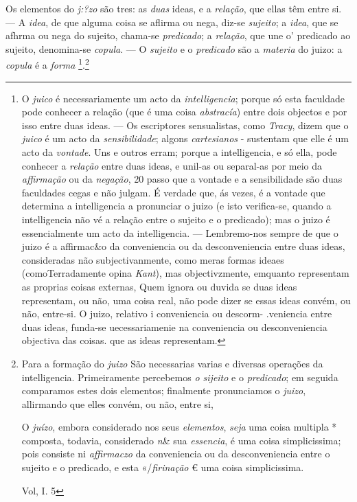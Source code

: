 Os elementos do \emph{j:?zo} são tres: as \emph{duas} ideas, e a \emph{relação}, que ellas têm entre si. --- A \emph{idea}, de que alguma coisa se aflirma ou nega, diz-se \emph{sujeito}; a \emph{idea}, que se afhrma ou nega do sujeito, chama-se \emph{predicado}; a \emph{relação}, que une o' predicado ao sujeito, denomina-se \emph{copula}. --- O \emph{sujeito} e o \emph{predicado} são a \emph{materia} do juizo: a \emph{copula} é a \emph{forma} \footnote{O \emph{juico} é necessariamente um acto da \emph{intelligencia}; porque só esta faculdade pode conhecer a relação (que é uma coisa \emph{abstracía}) entre dois objectos e por isso entre duas ideas. --- Os escriptores sensualistas, como \emph{Tracy}, dizem que o \emph{juico} é um acto da \emph{sensibilidade}; algons \emph{cartesianos} - sustentam que elle é um acto da \emph{vontade}. Uns e outros erram; porque a intelligencia, e só ella, pode conhecer a \emph{relação} entre duas ideas, e unil-as ou separal-as por meio da \emph{affirmação} ou da \emph{negação}, 20 passo que a vontade e a sensibilidade são duas faculdades cegas e não julgam. É verdade que, ás vezes, é a vontade que determina a intelligencia a pronunciar o juizo (e isto verifica-se, quando a intelligencia não vé a relação entre o sujeito e o predicado); mas o juizo é essencialmente um acto da intelligencia. --- Lembremo-nos sempre de que o juizo é a affirmac\&o da conveniencia ou da desconveniencia entre duas ideas, consideradas não subjectivanmente, como meras formas ideaes (comoTerradamente opina \emph{Kant}), mas objectivzmente, emquanto representam as proprias coisas externas, Quem ignora ou duvida se duas ideas representam, ou não, uma coisa real, não pode dizer se essas ideas convém, ou não, entre-si. O juizo, relativo i conveniencia ou descorm- .veniencia entre duas ideas, funda-se uecessariamenie na conveniencia ou desconveniencia objectiva das coisas. que as ideas representam.}.\footnote{Para a formação do \emph{juizo} São necessarias varias e diversas operações da intelligencia. Primeiramente percebemos \emph{o sijeito} e o \emph{predicado}; em seguida comparamos estes dois elementos; finalmente pronunciamos o \emph{juizo}, allirmando que elles convém, ou não, entre si,\par O \emph{juízo}, embora considerado nos seus \emph{elementos}, \emph{seja} uma coisa multipla * composta, todavia, considerado \emph{n}\& sua \emph{essencia}, é uma coisa simplicissima; pois consiste ni \emph{affirmaczo} da conveniencia ou da desconveniencia entre o sujeito e o predicado, e esta «/\emph{firinação} € uma coisa simplicissima.\par Vol, I. 5}

